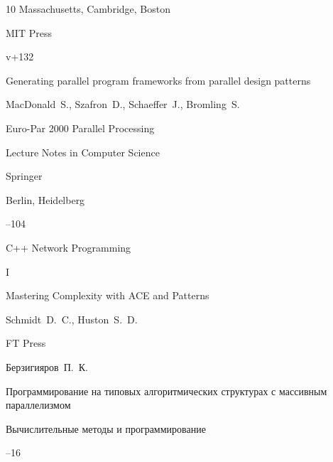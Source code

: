 \begin{thebibliography}{10}
\publaddr Massachu\-setts, Cambridge, Boston

\publ MIT Press


\totalpages v+132








\paper Generating parallel program frame\-works from parallel design patterns

\by MacDonald~S., Szafron~D., Schaeffer~J., Bromling~S.

\inbook  Euro-Par 2000 Parallel Processing


\serial Lecture Notes in Computer Science

\publ Springer 

\publaddr Berlin, Heidelberg


--104









\book C++ Network Programming

\bookvol I

\volinfo Mastering   Complexity with ACE and Patterns

\by Schmidt~D.~C., Huston~S.~D. 

\publ FT Press







\by Берзигияров~П.~К.

\paper Программирование на типовых алгоритмических   структурах с массивным параллелизмом

\jour Вычислительные методы и программирование




--16





\end{thebibliography}
